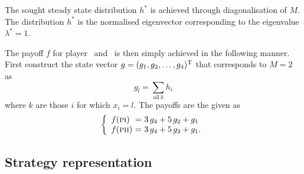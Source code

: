 The sought steady state distribution $h^\ast$ is achieved through diagonalisation of $M$. The distribution $h^\ast$ is the normalised eigenvector corresponding to the eigenvalue $\lambda^\ast = 1$.\mypar

The payoff $f$ for player \pone\ and \ptwo\ is then simply achieved in the following manner. First construct the state vector $g = (g_1, g_2, \dots, g_4)^{\mathrm{T}}$ that corresponds to $M = 2$ %
as
\begin{displaymath}
g_l = \sum_{\mathrm{all~} k } h_i
\end{displaymath}
where $k$ are those $i$ for which $x_i = l$. The payoffs are the given as
\begin{equation}
\left\{
\begin{array}{l@{~=~}l}
f(\pone) & 3\, g_4 + 5\, g_2 + g_1 \\[.5\baselineskip]
f(\ptwo) & 3\, g_4 + 5\, g_3 + g_1.
\end{array}
\right.
\label{equ:game:payoff}
\end{equation}

\subsection{Strategy representation}

